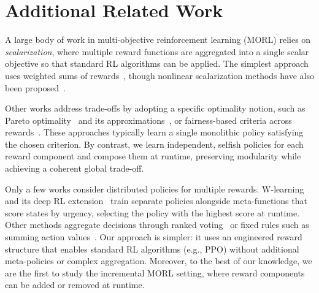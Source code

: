 \section{Additional Related Work}
\label{app:additional-related-work}

A large body of work in multi-objective reinforcement learning (MORL) relies on \textit{scalarization}, where multiple reward functions are aggregated into a single scalar objective so that standard RL algorithms can be applied. The simplest approach uses weighted sums of rewards~\citep{gass1955computational}, though nonlinear scalarization methods have also been proposed~\citep{van2013scalarized}. 

Other works address trade-offs by adopting a specific optimality notion, such as Pareto optimality~\citep{van2014multi} and its approximations~\citep{pirotta2015multi}, or fairness-based criteria across rewards~\citep{park2024max,byeon2025multi,siddique2020learning}. These approaches typically learn a single monolithic policy satisfying the chosen criterion. By contrast, we learn independent, selfish policies for each reward component and compose them at runtime, preserving modularity while achieving a coherent global trade-off.

Only a few works consider distributed policies for multiple rewards. W-learning~\citep{humphrys1995w} and its deep RL extension~\citep{rosero2024multi} train separate policies alongside meta-functions that score states by urgency, selecting the policy with the highest score at runtime. Other methods aggregate decisions through ranked voting~\citep{mendez2019multi} or fixed rules such as summing action values~\citep{russell2003q}. Our approach is simpler: it uses an engineered reward structure that enables standard RL algorithms (e.g., PPO) without additional meta-policies or complex aggregation. Moreover, to the best of our knowledge, we are the first to study the incremental MORL setting, where reward components can be added or removed at runtime.

